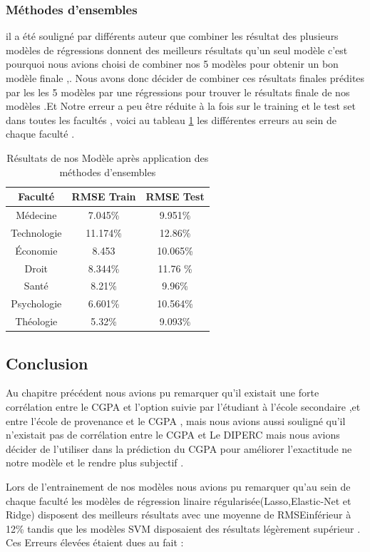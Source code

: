 \subsubsection{Méthodes d'ensembles}
il a été souligné par différents auteur \cite{bookSckit-Learn} que combiner les résultat des plusieurs modèles de régressions donnent des meilleurs résultats qu'un seul modèle c'est pourquoi nous avions choisi de combiner nos 5 modèles pour obtenir un bon modèle finale ,.
Nous avons donc décider de combiner ces résultats finales prédites par les  les 5 modèles par une régressions pour trouver le résultats finale de nos modèles .Et Notre erreur a peu être réduite à la fois sur le training et le test set dans toutes les facultés , voici au tableau \ref{tab:ensembleResults} les différentes erreurs au sein de chaque faculté .
\begin{table}[h!]
\centering
\begingroup %
\captionsetup{type=table} %
\caption{Résultats de nos Modèle après application des méthodes d'ensembles }
\label{tab:ensembleResults}
\begin{tabular}{|c|c|c|}
	\toprule
	Faculté &   RMSE Train  &RMSE Test \\
	\midrule
	Médecine &7.045\%&9.951\%\\
	Technologie&11.174\%&12.86\%\\
	Économie &8.453& 10.065\%\\
	Droit &8.344\%&11.76 \%\\
	Santé&8.21\%&9.96\%\\
	Psychologie&6.601\%&10.564\%\\
	Théologie&5.32\%&9.093\% \\
	\bottomrule
\end{tabular}
\endgroup
\end{table}
\subsection{Conclusion}
Au chapitre précédent nous avions pu remarquer qu'il existait une forte corrélation entre le CGPA et l'option suivie par l'étudiant à l'école secondaire ,et entre l'école de provenance et le CGPA , mais nous avions aussi souligné qu'il n'existait pas de corrélation entre le CGPA et Le DIPERC mais nous avions décider de l'utiliser dans la prédiction du CGPA pour améliorer l'exactitude ne notre modèle et le rendre plus subjectif  .

Lors de l'entrainement de nos modèles nous avions pu remarquer qu'au sein de chaque faculté les modèles de régression linaire régularisée(Lasso,Elastic-Net et Ridge) disposent des meilleurs résultats avec une moyenne de \ac{RMSE}inférieur à 12\% tandis que les modèles SVM disposaient des résultats légèrement supérieur .
Ces Erreurs élevées étaient dues au fait :

